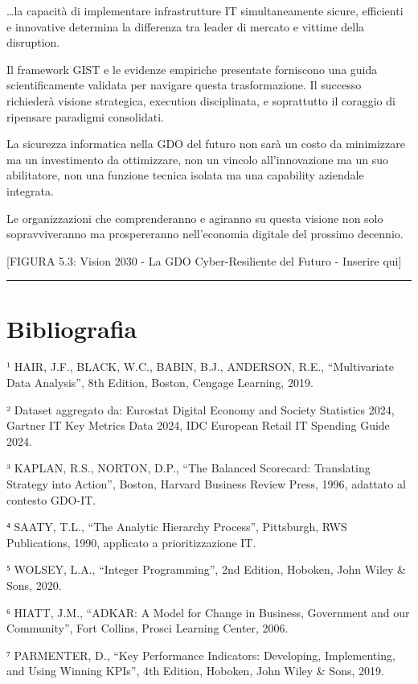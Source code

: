 \documentclass[12pt,a4paper,oneside]{book}
\numberwithin{figure}{chapter} %
\numberwithin{table}{chapter}  %
\begin{document}
\ldots la capacità di implementare infrastrutture IT simultaneamente
sicure, efficienti e innovative determina la differenza tra leader di
mercato e vittime della disruption.

Il framework GIST e le evidenze empiriche presentate forniscono una
guida scientificamente validata per navigare questa trasformazione. Il
successo richiederà visione strategica, execution disciplinata, e
soprattutto il coraggio di ripensare paradigmi consolidati.

La sicurezza informatica nella GDO del futuro non sarà un costo da
minimizzare ma un investimento da ottimizzare, non un vincolo
all'innovazione ma un suo abilitatore, non una funzione tecnica isolata
ma una capability aziendale integrata.

Le organizzazioni che comprenderanno e agiranno su questa visione non
solo sopravviveranno ma prospereranno nell'economia digitale del
prossimo decennio.

{[}FIGURA 5.3: Vision 2030 - La GDO Cyber-Resiliente del Futuro -
Inserire qui{]}

\begin{center}\rule{0.5\linewidth}{0.5pt}\end{center}

\section{Bibliografia}\label{bibliografia-2}

¹ HAIR, J.F., BLACK, W.C., BABIN, B.J., ANDERSON, R.E., ``Multivariate
Data Analysis'', 8th Edition, Boston, Cengage Learning, 2019.

² Dataset aggregato da: Eurostat Digital Economy and Society Statistics
2024, Gartner IT Key Metrics Data 2024, IDC European Retail IT Spending
Guide 2024.

³ KAPLAN, R.S., NORTON, D.P., ``The Balanced Scorecard: Translating
Strategy into Action'', Boston, Harvard Business Review Press, 1996,
adattato al contesto GDO-IT.

⁴ SAATY, T.L., ``The Analytic Hierarchy Process'', Pittsburgh, RWS
Publications, 1990, applicato a prioritizzazione IT.

⁵ WOLSEY, L.A., ``Integer Programming'', 2nd Edition, Hoboken, John
Wiley \& Sons, 2020.

⁶ HIATT, J.M., ``ADKAR: A Model for Change in Business, Government and
our Community'', Fort Collins, Prosci Learning Center, 2006.

⁷ PARMENTER, D., ``Key Performance Indicators: Developing, Implementing,
and Using Winning KPIs'', 4th Edition, Hoboken, John Wiley \& Sons,
2019.
\end{document}
